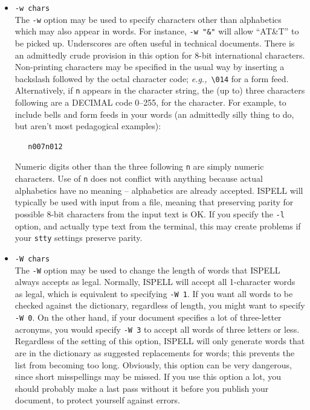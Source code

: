 \documentclass[twoside,11pt]{article}
\newcommand{\sunspec}[2]{#1}
\newcommand{\sunspec}[2]{#2}
\begin{document}
\begin{itemize}
\item {\Large\tt -w chars}\\
The \verb+-w+ option may be used to specify characters other than alphabetics
which may also appear in words.
For instance, \verb+-w "&"+ will allow ``AT\&T'' to be picked up.
Underscores are often useful in technical documents.
There is an admittedly crude provision in this option for 8-bit international
characters.
Non-printing characters may be specified in the usual way by inserting a
backslash followed by the octal character code; {\it{e.g.,}}\ \verb+\014+ for a
form feed.
Alternatively, if \verb+n+ appears in the character string, the (up to) three
characters following are a DECIMAL code 0\sunspec{--}{-}255, for the character.
For example, to include bells and form feeds in your words (an admittedly silly
thing to do, but aren't most pedagogical examples):

\begin{verbatim}
   n007n012
\end{verbatim}

Numeric digits other than the three following \verb+n+ are simply numeric
characters.  Use of \verb+n+ does not conflict with anything because actual
alphabetics have no meaning \sunspec{--}{-} alphabetics are already accepted.
ISPELL will typically be used with input from a file, meaning that preserving
parity for possible 8-bit characters from the input text is OK\@.
If you specify the \verb+-l+ option, and actually type text from the terminal,
this may create problems if your \verb+stty+ settings preserve parity.

\item {\Large\tt -W chars}\\
The \verb+-W+ option may be used to change the length of words that ISPELL
always accepts as legal.
Normally, ISPELL will accept all 1-character words as legal, which is equivalent
to specifying \verb+-W 1+\@.
If you want all words to be checked against the dictionary, regardless of
length, you might want to specify \verb+-W 0+\@.
On the other hand, if your document specifies a lot of three-letter acronyms,
you would specify \verb+-W 3+ to accept all words of three letters or less.
Regardless of the setting of this option, ISPELL will only generate words that
are in the dictionary as suggested replacements for words; this prevents the
list from becoming too long.  Obviously, this option can be very dangerous,
since short misspellings may be missed.  If you use this option a lot, you
should probably make a last pass without it before you publish your document,
to protect yourself against errors.


\end{itemize}
\end{document}
